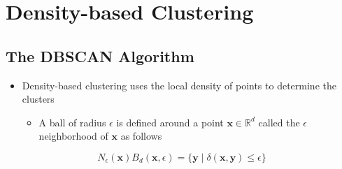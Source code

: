 \documentclass[11pt]{article}
\begin{document}
\section{Density-based Clustering}
\label{sec:org5b57e81}
\subsection{The DBSCAN Algorithm}
\label{sec:org093f273}
\begin{itemize}
\item Density-based clustering uses the local density of points to determine the clusters
\begin{itemize}
\item A ball of radius \(\epsilon\) is defined around a point \(\pmb x \in \mathbb R^d\) called the \(\epsilon\) neighborhood of \(\pmb x\) as follows
\end{itemize}
\end{itemize}
\begin{equation}
  N_\epsilon (\pmb x) B_d(\pmb x, \epsilon) = \{ \pmb y \mid \delta(\pmb x, \pmb y) \leq \epsilon \}
\end{equation}
\end{document}
